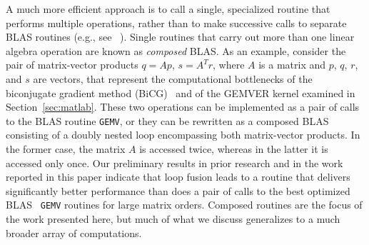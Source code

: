\documentclass[runningheads]{llncs}
\begin{document}
A much more efficient approach is to call a single, specialized routine that
performs multiple operations, rather than to make successive calls to separate BLAS
routines (e.g., see ~\cite{gropp01}).
Single routines that carry out more than one linear algebra operation are
known as \emph{composed} BLAS. As an example, consider the pair of
matrix-vector products $q = Ap$, $s = A^Tr$, where $A$ is a matrix and $p$,
$q$, $r$, and $s$ are vectors, that represent the computational bottlenecks
of the biconjugate gradient method (BiCG)~\cite{Saad:2003fk} and of the
GEMVER kernel examined in Section~\ref{sec:matlab}.  These two operations can
be implemented as a pair of calls to the BLAS routine {\tt GEMV}, or they can
be rewritten as a composed BLAS consisting of a doubly nested loop
encompassing both matrix-vector products. In the former case, the matrix $A$
is accessed twice, whereas in the latter it is accessed only once. Our
preliminary results in prior research and in the work reported in this paper
indicate that loop fusion leads to a routine that delivers significantly
better performance than does a pair of calls to the best optimized BLAS {\tt
GEMV} routines for large matrix orders.  Composed routines are the focus of
the work presented here, but much of what we discuss generalizes to a much
broader array of computations.
\end{document}
